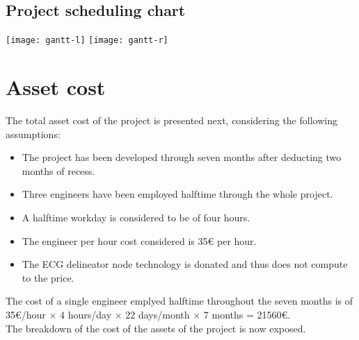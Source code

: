 	\cleartoleftpage
	\subsection{Project scheduling chart}
	    	\texttt{[image: gantt-l]}
	    	\texttt{[image: gantt-r]}

\section{Asset cost}

	The total asset cost of the project is presented next, considering the following assumptions:
	\begin{itemize}
		\item The project has been developed through seven months after deducting two months of recess.
		\item Three engineers have been employed halftime through the whole project.
		\item A halftime workday is considered to be of four hours.
		\item The engineer per hour cost considered is 35{\small \euro} per hour.
		\item The ECG delineator node technology is donated and thus does not compute to the price.
	\end{itemize}

	The cost of a single engineer emplyed halftime throughout the seven months is of 35{\small \euro}/hour $\times$ 4 hours/day $\times$ 22 days/month $\times$ 7 months = 21560{\small \euro}.\\

	The breakdown of the cost of the assets of the project is now exposed.\\

